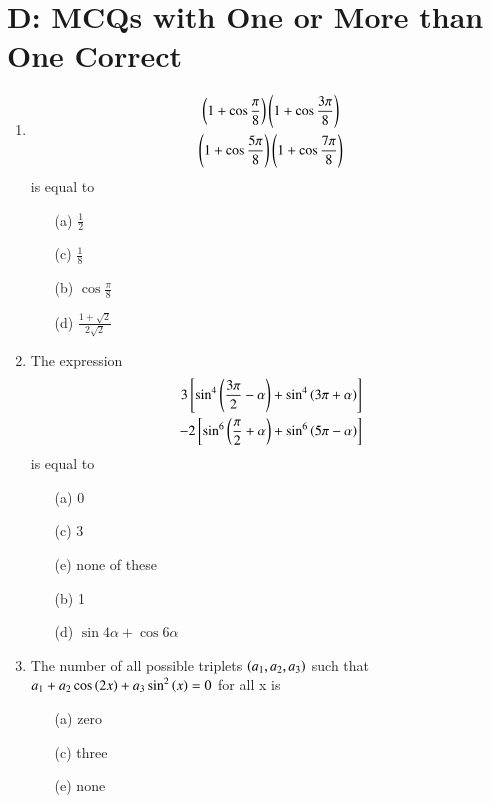 \documentclass[journal,12pt,twocolumn,article]{IEEEtran}
\theoremstyle{remark}
\begin{document}
\section*{D: MCQs with One or More than One Correct}
\begin{enumerate}
\item 
\begin{multline*}
\left(1 + \cos\frac{\pi}{8}\right)\left(1 + \cos\frac{3\pi}{8}\right)\\
\left(1 + \cos\frac{5\pi}{8}\right)\left(1 + \cos\frac{7\pi}{8}\right) 
\end{multline*}
is equal to
\hfill{}
\begin{multicols}{2}
\begin{enumerate}
\item[(a)] $\frac{1}{2}$
\item[(c)] $\frac{1}{8}$
\columnbreak
\item[(b)] $\cos \frac{\pi}{8}$
\item[(d)] $\frac{1+\sqrt{2}}{2\sqrt{2}}$
\end{enumerate}
\end{multicols}
\item The expression 
\begin{align*}
3{}\left[\sin^4\left(\frac{3\pi}{2} - \alpha\right) + \sin^4\left(3\pi + \alpha\right)\right]  \\ - 2{}\left[\sin^6\left(\frac{\pi}{2} + \alpha\right) + \sin^6\left(5\pi - \alpha\right)\right]
\end{align*}
is equal to
\hfill{}
\begin{multicols}{2}
\begin{enumerate}
\item[(a)] 0
\item[(c)] 3
\item[(e)] none of these
\columnbreak
\item[(b)] 1
\item[(d)] $\sin4\alpha + \cos6\alpha$
\end{enumerate}
\end{multicols}
\item The number of all possible triplets $\left(a_1, a_2, a_3\right)$ such that $a_1 + a_2 \cos\left(2x\right) + a_3\sin^2\left(x\right) = 0$ for all x is
\hfill{}
\begin{multicols}{2}
\begin{enumerate}
\item[(a)] zero
\item[(c)] three
\item[(e)] none

\end{enumerate}
\end{multicols}
\end{enumerate}
\end{document}
